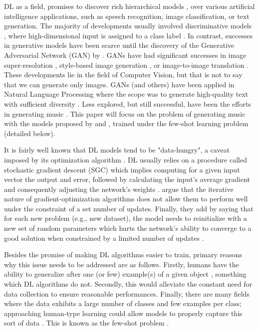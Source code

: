 \documentclass[11pt, a4paper, man, floatsintext]{apa6}
\begin{document}
DL as a field, promises to discover rich hierarchical models \parencite{lecun_deep_2015}, over various artificial intelligence applications, such as speech recognition, image classification, or text generation. The majority of developments usually involved discriminative models \parencite{goodfellow_generative_2014}, where high-dimensional input is assigned to a class label \parencite[e.g.,][]{krizhevsky_imagenet_2012}. In contrast, successes in generative models have been scarce until the discovery of the Generative Adversarial Network (GAN) by \textcite{goodfellow_generative_2014}. GANs have had significant successes in image super-resolution \parencite{ledig_photo-realistic_2016}, style-based image generation \parencite{karras_style-based_2018}, or image-to-image translation \parencite[such as a sketch into a photorealistic image;][]{isola_image--image_2016}. These developments lie in the field of Computer Vision, but that is not to say that we can generate only images. GANs (and others) have been applied in Natural Language Processing where the scope was to generate high-quality text with sufficient diversity \parencite[e.g.,][]{yu_seqgan_2016, chen_adversarial_2018}. Less explored, but still successful, have been the efforts in generating music \parencite[e.g.,][]{mogren_c-rnn-gan_2016, dong_musegan_2017}. This paper will focus on the problem of generating music with the models proposed by \textcite{mogren_c-rnn-gan_2016} and \textcite{oore_this_2018}, trained under the few-shot learning problem (detailed below).

It is fairly well known that DL models tend to be "data-hungry", a caveat imposed by its optimization algorithm \parencite{chen_closer_2018, ravi_optimization_2016}. DL usually relies on a procedure called stochastic gradient descent (SGC) which implies computing for a given input vector the output and error, followed by calculating the input's average gradient and consequently adjusting the network's weights \parencite{lecun_deep_2015}. \textcite{ravi_optimization_2016} argue that the iterative nature of gradient-optimization algorithms does not allow them to perform well under the constraint of a set number of updates. Finally, they add by saying that for each new problem (e.g., new dataset), the model needs to reinitialize with a new set of random parameters which hurts the network's ability to converge to a good solution when constrained by a limited number of updates \parencite{ravi_optimization_2016}.

Besides the promise of making DL algorithms easier to train, primary reasons why this issue needs to be addressed are as follows. Firstly, humans have the ability to generalize after one (or few) example(s) of a given object \parencite{vinyals_matching_2016, ravi_optimization_2016}, something which DL algorithms do not. Secondly, this would alleviate the constant need for data collection to ensure reasonable performances. Finally, there are many fields where the data exhibits a large number of classes and few examples per class; approaching human-type learning could allow models to properly capture this sort of data \parencite{ravi_optimization_2016, larochelle_few-shot_2017}. This is known as the few-shot problem \parencite{vinyals_matching_2016}.
\end{document}
